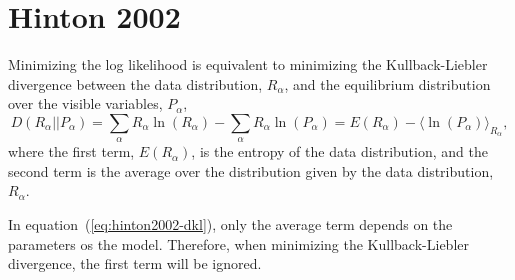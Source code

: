 \section{Hinton 2002}

Minimizing the log likelihood is equivalent to minimizing the Kullback-Liebler divergence between the data distribution, $R_{\alpha}$, and the equilibrium distribution over the visible variables, $P_{\alpha}$,
\begin{equation}
    \label{eq:hinton2002-dkl}
    D(R_{\alpha} || P_{\alpha}) = \sum_{\alpha} R_{\alpha} \ln(R_{\alpha}) - \sum_{\alpha} R_{\alpha} \ln(P_{\alpha}) = E(R_{\alpha}) - {\langle \ln(P_{\alpha}) \rangle}_{R_{\alpha}},
\end{equation}
where the first term, $E(R_{\alpha})$, is the entropy of the data distribution, and the second term is the average over the distribution given by the data distribution, $R_{\alpha}$.

In equation~(\ref{eq:hinton2002-dkl}), only the average term depends on the parameters os the model. Therefore, when minimizing the Kullback-Liebler divergence, the first term will be ignored.





